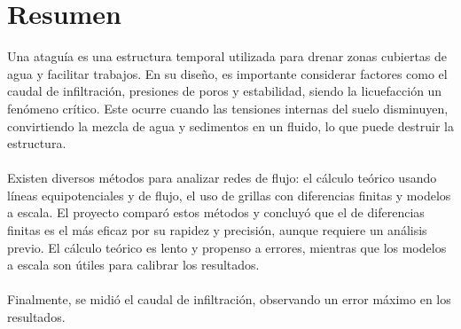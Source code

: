 \section*{Resumen}
Una ataguía es una estructura temporal utilizada para drenar zonas cubiertas de agua y facilitar trabajos. En su diseño, es importante considerar factores como el caudal de infiltración, presiones de poros y estabilidad, siendo la licuefacción un fenómeno crítico. Este ocurre cuando las tensiones internas del suelo disminuyen, convirtiendo la mezcla de agua y sedimentos en un fluido, lo que puede destruir la estructura.
\\ \\
Existen diversos métodos para analizar redes de flujo: el cálculo teórico usando líneas equipotenciales y de flujo, el uso de grillas con diferencias finitas y modelos a escala. El proyecto comparó estos métodos y concluyó que el de diferencias finitas es el más eficaz por su rapidez y precisión, aunque requiere un análisis previo. El cálculo teórico es lento y propenso a errores, mientras que los modelos a escala son útiles para calibrar los resultados.
\\ \\
Finalmente, se midió el caudal de infiltración, observando un error máximo en los resultados.